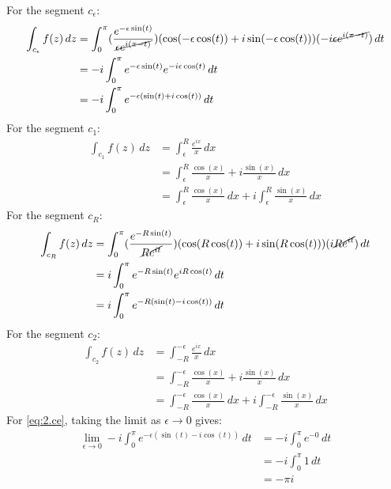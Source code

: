 \documentclass[a4paper, titlepage, DIV=14]{scrartcl}
\begin{document}
    For the segment $c_{\epsilon}$:
    \begin{align}
        \int_{c_{\epsilon}} f(z) \, dz &= \int_{0}^{\pi}(\frac{e^{-\epsilon\sin(t)}}
            {\cancel{\epsilon e^{i(\pi-t)}}})(\cos(-\epsilon\cos(t)) + i\sin(-\epsilon\cos(t)))
            (-i\cancel{\epsilon e^{i(\pi-t)}}) \, dt \nonumber\\
            &= -i\int_{0}^{\pi}e^{-\epsilon\sin(t)}e^{-i\epsilon\cos(t)} \, dt \nonumber \\
            &= -i\int_{0}^{\pi}e^{-\epsilon(\sin(t)+i\cos(t))} \, dt \label{eq:2.ce} 
    \end{align}
    For the segment $c_{1}$:
    \begin{align}
        \int_{c_{1}} f(z) \, dz &= \int_{\epsilon}^{R} \frac{e^{ix}}{x} \, dx \nonumber\\
            &= \int_{\epsilon}^{R} \frac{\cos(x)}{x} + i\frac{\sin(x)}{x} \, dx \nonumber\\
            &= \int_{\epsilon}^{R} \frac{\cos(x)}{x} \, dx + i\int_{\epsilon}^{R} \frac{\sin(x)}{x} \, dx \label{eq:2.c1}
    \end{align} 
    For the segment $c_{R}$:
    \begin{align}
        \int_{c_{R}} f(z) \, dz &= \int_{0}^{\pi} (\frac{e^{-R\sin(t)}}{\cancel{Re^{it}}})(\cos(R\cos(t)) + i\sin(R\cos(t)))(i\cancel{Re^{it}}) \, dt \nonumber\\
            &= i\int_{0}^{\pi}e^{-R\sin(t)}e^{iR\cos(t)} \, dt \nonumber\\
            &= i\int_{0}^{\pi}e^{-R(\sin(t)-i\cos(t))} \, dt \label{eq:2.cr} 
    \end{align}
    For the segment $c_{2}$:
    \begin{align}
        \int_{c_{2}} f(z) \, dz &= \int_{-R}^{-\epsilon} \frac{e^{ix}}{x} \, dx \nonumber\\
            &= \int_{-R}^{-\epsilon} \frac{\cos(x)}{x} + i\frac{\sin(x)}{x} \, dx \nonumber\\
            &= \int_{-R}^{-\epsilon} \frac{\cos(x)}{x} \, dx + i\int_{-R}^{-\epsilon} \frac{\sin(x)}{x} \, dx \label{eq:2.c2}
    \end{align} 
    For \eqref{eq:2.ce}, taking the limit as $\epsilon\to0$ gives:
    \begin{align}
        \lim_{\epsilon\to0} -i\int_{0}^{\pi}e^{-\epsilon(\sin(t)-i\cos(t))} \, dt &= -i\int_{0}^{\pi}e^{-0} \, dt \nonumber \\
            &= -i\int_{0}^{\pi} 1 \, dt \nonumber\\
            &= -\pi i \label{eq:2.limce}
    \end{align}
\end{document}
